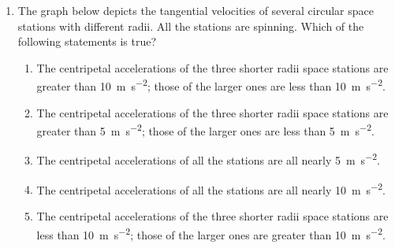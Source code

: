 \documentclass{../../../oss-apphys}
\begin{document}
\begin{multicols}{2}
\begin{enumerate}[leftmargin=18pt,resume]
  \item The graph below depicts the tangential velocities of several circular
    space stations with different radii. All the stations are spinning. Which
    of the following statements is true?
    \begin{enumerate}[nosep,leftmargin=18pt,label=(\Alph*)]
    \item The centripetal accelerations of the three shorter radii space
      stations are greater than \SI{10}{\metre\per\second\squared}; those of
      the larger ones are less than \SI{10}{\metre\per\second\squared}.
    \item  The centripetal accelerations of the three shorter radii space
      stations are greater than \SI{5}{\metre\per\second\squared}; those of
      the larger ones are less than \SI{5}{\metre\per\second\squared}.
    \item The centripetal accelerations of all the stations are all nearly
      \SI{5}{\metre\per\second\squared}.
    \item The centripetal accelerations of all the stations are all nearly
      \SI{10}{\metre\per\second\squared}.
    \item The centripetal accelerations of the three shorter radii space
      stations are less than \SI{10}{\metre\per\second\squared}; those of the
      larger ones are greater than \SI{10}{\metre\per\second\squared}.
    \end{enumerate}
  \end{enumerate}
\end{multicols}
\newpage


\genfreedirections
\end{document}
